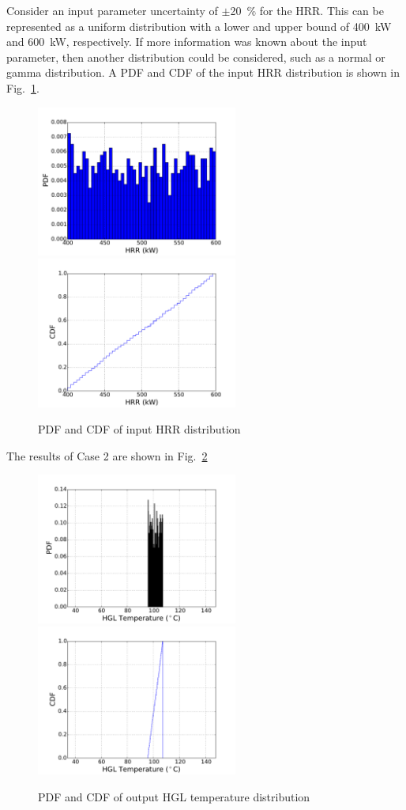 \documentclass[12pt]{article}
\begin{document}
Consider an input parameter uncertainty of $\pm$20~\% for the HRR. This can be represented as a uniform distribution with a lower and upper bound of 400~kW and 600~kW, respectively. If more information was known about the input parameter, then another distribution could be considered, such as a normal or gamma distribution. A PDF and CDF of the input HRR distribution is shown in Fig.~\ref{fig:case_2_input_distributions}.
\begin{figure}[!ht]
\includegraphics[width=2.6in]{Figures/input_PDF}
\includegraphics[width=2.6in]{Figures/input_CDF}
\caption{PDF and CDF of input HRR distribution}
\label{fig:case_2_input_distributions}
\end{figure}

The results of Case 2 are shown in Fig.~\ref{fig:case_2_output_distributions}

\begin{figure}[!ht]
\includegraphics[width=2.6in]{Figures/output_PDF_2_input}
\includegraphics[width=2.6in]{Figures/output_CDF_2_input}
\caption{PDF and CDF of output HGL temperature distribution}
\label{fig:case_2_output_distributions}
\end{figure}
\end{document}
